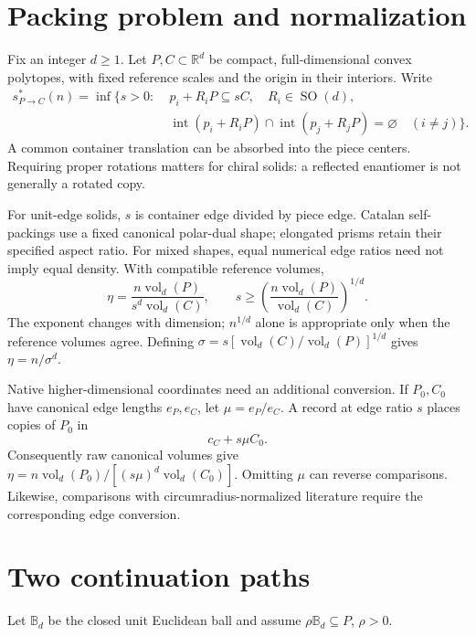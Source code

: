 \documentclass[11pt,a4paper]{article}
\newcommand{\R}{\mathbb R}
\newcommand{\B}{\mathbb B}
\newcommand{\SO}{\operatorname{SO}}
\newcommand{\vol}{\operatorname{vol}}
\begin{document}
\section{Packing problem and normalization}
Fix an integer $d\geq1$. Let $P,C\subset\R^d$ be compact, full-dimensional convex polytopes, with fixed reference scales and the origin in their interiors. Write
\begin{equation}
\begin{split}
s^*_{P\to C}(n)=\inf\{s>0:\;&p_i+R_iP\subseteq sC,\quad R_i\in\SO(d),\\
&\operatorname{int}(p_i+R_iP)\cap\operatorname{int}(p_j+R_jP)=\varnothing
\quad(i\ne j)\}.
\end{split}
\end{equation}
A common container translation can be absorbed into the piece centers. Requiring proper rotations matters for chiral solids: a reflected enantiomer is not generally a rotated copy.

For unit-edge solids, $s$ is container edge divided by piece edge. Catalan self-packings use a fixed canonical polar-dual shape; elongated prisms retain their specified aspect ratio. For mixed shapes, equal numerical edge ratios need not imply equal density. With compatible reference volumes,
\begin{equation}\label{eq:density}
\eta=\frac{n\vol_d(P)}{s^d\vol_d(C)},\qquad
s\geq\left(\frac{n\vol_d(P)}{\vol_d(C)}\right)^{1/d}.
\end{equation}
The exponent changes with dimension; $n^{1/d}$ alone is appropriate only when the reference volumes agree. Defining $\sigma=s[\vol_d(C)/\vol_d(P)]^{1/d}$ gives $\eta=n/\sigma^d$.

Native higher-dimensional coordinates need an additional conversion. If $P_0,C_0$ have canonical edge lengths $e_P,e_C$, let $\mu=e_P/e_C$. A record at edge ratio $s$ places copies of $P_0$ in
\begin{equation}\label{eq:native}
c_C+s\mu C_0.
\end{equation}
Consequently raw canonical volumes give
$\eta=n\vol_d(P_0)/[(s\mu)^d\vol_d(C_0)]$. Omitting $\mu$ can reverse comparisons. Likewise, comparisons with circumradius-normalized literature require the corresponding edge conversion.

\section{Two continuation paths}
Let $\B_d$ be the closed unit Euclidean ball and assume $\rho\B_d\subseteq P$, $\rho>0$.
\end{document}
